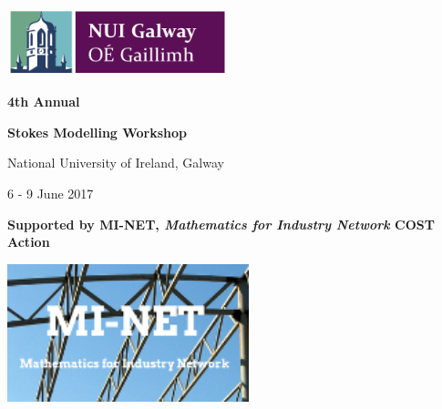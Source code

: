 \documentclass[a4paper, 11pt]{article}
\begin{document}
\renewcommand{\familydefault}{\sfdefault}
\sffamily


\thispagestyle{empty}
\onehalfspace
\vspace*{5pt}
\begin{center}
\includegraphics[height=2cm]{nuig-logo}
\end{center}
\vspace{10pt}

\hrulefill

\vspace{10pt}

\centerline{\textbf{\Large 4th Annual}}
\vspace{10pt}

\centerline{\textbf{\Huge Stokes Modelling Workshop}}
\vspace{10pt}


\hrulefill

\vspace{10pt}

\centerline{\Large National University of Ireland, Galway}
\vspace{10pt}

\centerline{\large 6 - 9 June 2017}
\vspace{20pt}


\begin{center}
\centerline{\Large \textbf{Supported by MI-NET, \emph{Mathematics for Industry
    Network} COST Action}}
\vspace{10pt}
 \includegraphics[height=4cm]{MI-Net}
\end{center}
\end{document}
